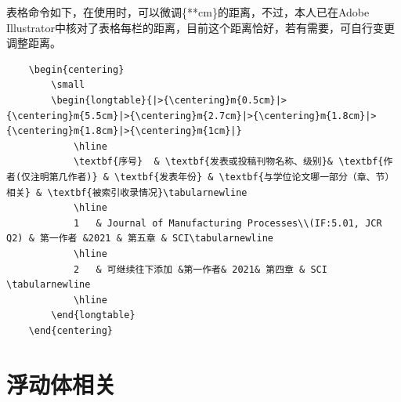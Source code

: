 表格命令如下，在使用时，可以微调\{**cm\}的距离，不过，本人已在Adobe Illustrator中核对了表格每栏的距离，目前这个距离恰好，若有需要，可自行变更调整距离。
\begin{lstlisting}
    \begin{centering}
        \small
        \begin{longtable}{|>{\centering}m{0.5cm}|>{\centering}m{5.5cm}|>{\centering}m{2.7cm}|>{\centering}m{1.8cm}|>{\centering}m{1.8cm}|>{\centering}m{1cm}|}
            \hline 
            \textbf{序号}  & \textbf{发表或投稿刊物名称、级别}& \textbf{作者(仅注明第几作者)} & \textbf{发表年份} & \textbf{与学位论文哪一部分（章、节）相关} & \textbf{被索引收录情况}\tabularnewline
            \hline 
            1   & Journal of Manufacturing Processes\\(IF:5.01, JCR Q2) & 第一作者 &2021 & 第五章 & SCI\tabularnewline
            \hline 
            2	& 可继续往下添加 &第一作者& 2021& 第四章 & SCI \tabularnewline
            \hline
        \end{longtable}
    \end{centering}
\end{lstlisting}

\section{浮动体相关}

